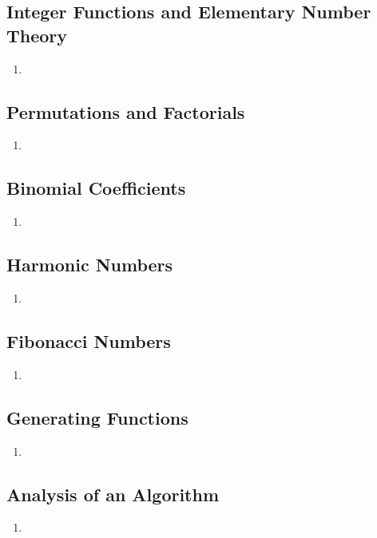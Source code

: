 \documentclass[Main.tex]{subfiles}
\begin{document}
\subsection{Integer Functions and Elementary Number Theory}
\begin{enumerate}
    \item 
\end{enumerate}

\subsection{Permutations and Factorials}
\begin{enumerate}
    \item 
\end{enumerate}

\subsection{Binomial Coefficients}
\begin{enumerate}
    \item 
\end{enumerate}

\subsection{Harmonic Numbers}
\begin{enumerate}
    \item 
\end{enumerate}

\subsection{Fibonacci Numbers}
\begin{enumerate}
    \item 
\end{enumerate}

\subsection{Generating Functions}
\begin{enumerate}
    \item 
\end{enumerate}

\subsection{Analysis of an Algorithm}
\begin{enumerate}
    \item 
\end{enumerate}
\end{document}

